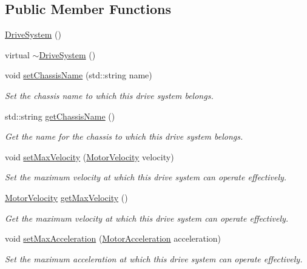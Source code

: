 \subsection*{Public Member Functions}
\begin{DoxyCompactItemize}
\item 
\hyperlink{classDriveSystem_ae01dd44e98832cd3fd53d34e11d53daa}{Drive\-System} ()
\item 
virtual \hyperlink{classDriveSystem_ab571a24395df418db8721d1e75348c2a}{$\sim$\-Drive\-System} ()
\item 
void \hyperlink{classDriveSystem_add520db676d50658a45813bc4620ed28}{set\-Chassis\-Name} (std\-::string name)
\begin{DoxyCompactList}\small\item\em Set the chassis name to which this drive system belongs. \end{DoxyCompactList}\item 
std\-::string \hyperlink{classDriveSystem_ae7099ada003ded0f8e29f1394e41c88a}{get\-Chassis\-Name} ()
\begin{DoxyCompactList}\small\item\em Get the name for the chassis to which this drive system belongs. \end{DoxyCompactList}\item 
void \hyperlink{classDriveSystem_a0fcba2555b44f81ba8a4f8eb07119a2d}{set\-Max\-Velocity} (\hyperlink{classMotorVelocity}{Motor\-Velocity} velocity)
\begin{DoxyCompactList}\small\item\em Set the maximum velocity at which this drive system can operate effectively. \end{DoxyCompactList}\item 
\hyperlink{classMotorVelocity}{Motor\-Velocity} \hyperlink{classDriveSystem_ac34dc1ce697223d25f978ba2ace3a164}{get\-Max\-Velocity} ()
\begin{DoxyCompactList}\small\item\em Get the maximum velocity at which this drive system can operate effectively. \end{DoxyCompactList}\item 
void \hyperlink{classDriveSystem_a4c2924e7b017844a0517e1a915761e0b}{set\-Max\-Acceleration} (\hyperlink{classMotorAcceleration}{Motor\-Acceleration} acceleration)
\begin{DoxyCompactList}\small\item\em Set the maximum acceleration at which this drive system can operate effectively. \end{DoxyCompactList}\item 

\end{DoxyCompactItemize}
